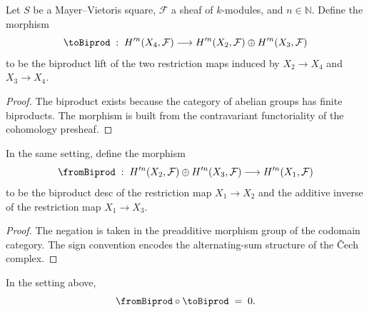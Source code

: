 \begin{definition}\leanok
  \label{def:Scheme_HModule_prime_toBiprod}

  Let \(S\) be a Mayer--Vietoris square, \(\mathcal F\) a sheaf of \(k\)-modules, and \(n \in \mathbb N\). Define the morphism
  \[
    \toBiprod \;:\; H^{\prime n}(X_4, \mathcal F) \longrightarrow H^{\prime n}(X_2, \mathcal F) \oplus H^{\prime n}(X_3, \mathcal F)
  \]
  to be the biproduct lift of the two restriction maps induced by \(X_2 \to X_4\) and \(X_3 \to X_4\).
\end{definition}

\begin{proof}

  \leanok
  The biproduct exists because the category of abelian groups has finite biproducts. The morphism is built from the contravariant functoriality of the cohomology presheaf.
\end{proof}

\begin{definition}\leanok
  \label{def:Scheme_HModule_prime_fromBiprod}

  In the same setting, define the morphism
  \[
    \fromBiprod \;:\; H^{\prime n}(X_2, \mathcal F) \oplus H^{\prime n}(X_3, \mathcal F) \longrightarrow H^{\prime n}(X_1, \mathcal F)
  \]
  to be the biproduct desc of the restriction map \(X_1 \to X_2\) and the additive inverse of the restriction map \(X_1 \to X_3\).
\end{definition}

\begin{proof}

  \leanok
  The negation is taken in the preadditive morphism group of the codomain category. The sign convention encodes the alternating-sum structure of the \v{C}ech complex.
\end{proof}

\begin{lemma}\leanok
  \label{lem:Scheme_HModule_prime_toBiprod_fromBiprod}

  In the setting above,
  \[
    \fromBiprod \circ \toBiprod \;=\; 0.
  \]
\end{lemma}

